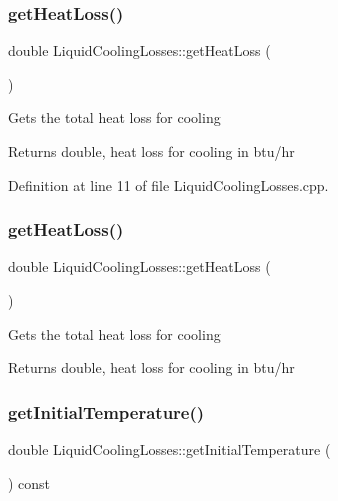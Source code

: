 \subsubsection{\texorpdfstring{get\+Heat\+Loss()}{getHeatLoss()}\hspace{0.1cm}{\footnotesize\ttfamily [2/3]}}
{\footnotesize\ttfamily double Liquid\+Cooling\+Losses\+::get\+Heat\+Loss (\begin{DoxyParamCaption}{ }\end{DoxyParamCaption})}

Gets the total heat loss for cooling \begin{DoxyReturn}{Returns}
double, heat loss for cooling in btu/hr 
\end{DoxyReturn}


Definition at line 11 of file Liquid\+Cooling\+Losses.\+cpp.

\mbox{\label{class_liquid_cooling_losses_a6a131f8f3141edef7f29df4455c6aee5}} 
\subsubsection{\texorpdfstring{get\+Heat\+Loss()}{getHeatLoss()}\hspace{0.1cm}{\footnotesize\ttfamily [3/3]}}
{\footnotesize\ttfamily double Liquid\+Cooling\+Losses\+::get\+Heat\+Loss (\begin{DoxyParamCaption}{ }\end{DoxyParamCaption})}

Gets the total heat loss for cooling \begin{DoxyReturn}{Returns}
double, heat loss for cooling in btu/hr 
\end{DoxyReturn}
\mbox{\label{class_liquid_cooling_losses_a4cfb23800b80e99858bbc5c3ef5169eb}} 
\subsubsection{\texorpdfstring{get\+Initial\+Temperature()}{getInitialTemperature()}\hspace{0.1cm}{\footnotesize\ttfamily [1/3]}}
{\footnotesize\ttfamily double Liquid\+Cooling\+Losses\+::get\+Initial\+Temperature (\begin{DoxyParamCaption}{ }\end{DoxyParamCaption}) const\hspace{0.3cm}{\ttfamily [inline]}}

